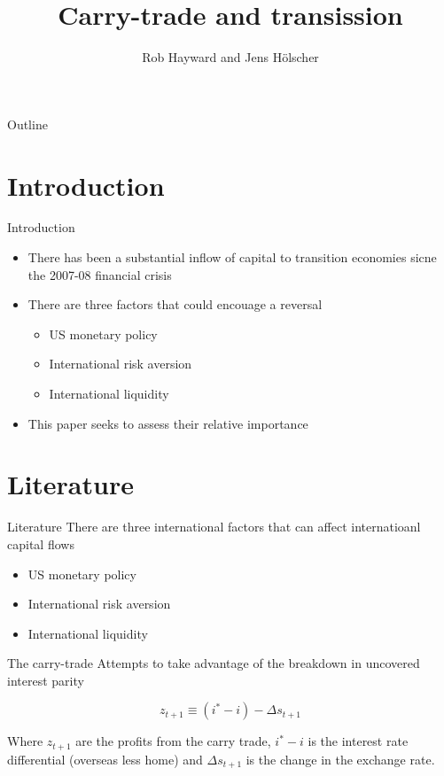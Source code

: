 \documentclass[14pt,xcolor=pdftex,dvipsnames,table]{beamer}
\title{Carry-trade and transission}
\author{Rob Hayward and Jens H\"{o}lscher}
\begin{document}
\begin{frame}
\titlepage
\end{frame}

\begin{frame}{Outline}
\tableofcontents
\end{frame}

\section{Introduction}
\begin{frame}{Introduction}
\begin{itemize}[<+-| alert@+>]
\item There has been a substantial inflow of capital to transition economies sicne the 2007-08 financial crisis
\item There are three factors that could encouage a reversal
\begin{itemize}[<+-| alert@+>]
\item US monetary policy
\item International risk aversion
\item International liquidity
\end{itemize}
\item This paper seeks to assess their relative importance
\end{itemize}
\end{frame}



\section{Literature}
\begin{frame}{Literature}
There are three international factors that can affect internatioanl capital flows
\begin{itemize}[<+-| alert@+>]
\item US monetary policy
\item International risk aversion
\item International liquidity
\end{itemize}
\end{frame}

\begin{frame}{The carry-trade}
Attempts to take advantage of the breakdown in uncovered interest parity
\begin{block}{}
\begin{equation}\label{eqref:carry}
z_{t+1} \equiv (i^* - i) -\Delta s_{t+1}
\end{equation}
\pause
\end{block}
Where $z_{t+1}$ are the profits from the carry trade, $i^* - i$ is the interest rate differential (overseas less home) and $\Delta s_{t+1}$ is the change in the exchange rate.    
\end{frame}
\end{document}
